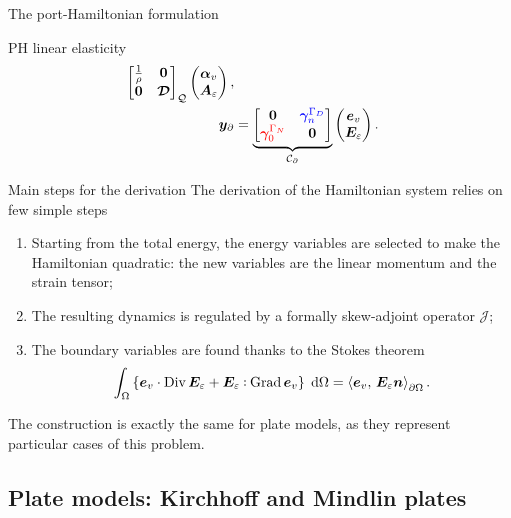 \documentclass[aspectratio=169]{ISAE-Beamer}
\DeclareMathOperator*{\Grad}{Grad}
\DeclareMathOperator*{\Div}{Div}
\newcommand{\inner}[3][]{\ensuremath{\left\langle #2, \, #3 \right\rangle_{#1}}}
\def\onedot{$\mathsurround0pt\ldotp$}
\def\cddot{%
	\mathbin{\vcenter{\baselineskip.67ex
			\hbox{\onedot}\hbox{\onedot}}%
}}
\begin{document}
\begin{frame}{The port-Hamiltonian formulation}
\begin{block}{PH linear elasticity}
\begin{equation*}
\begin{aligned}
{		\begin{bmatrix}
		\frac{1}{\rho} & \bm{0} \\
		\bm{0} & \bm{\mathcal{D}} \\
		\end{bmatrix}}_{\mathcal{Q}}
	\begin{pmatrix}
	\bm{\alpha}_v \\
	\bm{A}_\varepsilon
	\end{pmatrix}, \\
	\bm{y}_\partial &= \underbrace{
		\begin{bmatrix}
		\bm{0} & \textcolor{blue}{\bm\gamma_{n}^{\Gamma_D}} \\
		\textcolor{red}{\bm\gamma_0^{\Gamma_N}} & \bm{0} \\
		\end{bmatrix}}_{\mathcal{C}_\partial}
	\begin{pmatrix}
	\bm{e}_v \\
	\bm{E}_\varepsilon
	\end{pmatrix}.
	\end{aligned}
	\end{equation*}
	\end{block}
\end{frame}

\begin{frame}{Main steps for the derivation}
The derivation of the Hamiltonian system relies on few simple steps  
\begin{enumerate}
\item Starting from the total energy, the energy variables are selected to make the Hamiltonian quadratic: the new variables are the linear momentum and the strain tensor;
\item The resulting dynamics is regulated by a formally skew-adjoint operator $\mathcal{J}$;
\item The boundary variables are found thanks to the Stokes theorem
\[
\int_{\Omega} \left\{\bm{e}_v \cdot \Div \bm{E}_\varepsilon + \bm{E}_\varepsilon \cddot \Grad \bm{e}_v \right\}\d\Omega = \inner[\partial\Omega]{\bm{e}_v}{\bm{E}_\varepsilon\bm{n}}.
\]
\end{enumerate}

The construction is exactly the same for plate models, as they represent particular cases of this problem.
\end{frame}

\subsection{Plate models: Kirchhoff and Mindlin plates}
\end{document}
